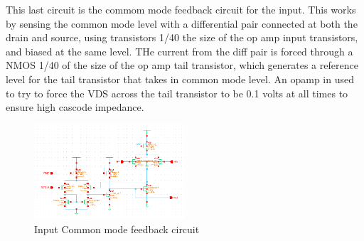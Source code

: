 \documentclass[conference]{IEEEtran}
\begin{document}
This last circuit is the commom mode feedback circuit for the input. This works by sensing the common mode level with a differential pair connected at both the drain and source, using transistors 1/40 the size of the op amp input transistors, and biased at the same level. THe current from the diff pair is forced through a NMOS 1/40 of the size of the op amp tail transistor, which generates a reference level for the tail transistor that takes in common mode level. An opamp in used to try to force the VDS across the tail transistor to be 0.1 volts at all times to ensure high cascode impedance.
\FloatBarrier
\begin{figure}[htb]
\centering
\includegraphics[width=0.5\textwidth]{cmifb.png}
\caption{Input Common mode feedback circuit}
\label{folded}
\end{figure}
\FloatBarrier
\end{document}
